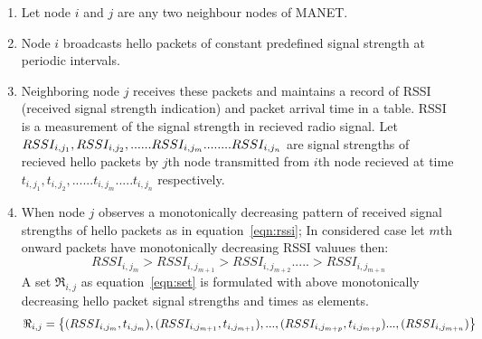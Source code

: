\documentclass[runningheads]{llncs}
\begin{document}
	\begin{enumerate}
		\item Let node $i$ and $j$ are any two neighbour nodes of MANET.
		\item Node $i$  broadcasts hello packets of constant predefined signal strength at periodic intervals.
		\item Neighboring node $j$ receives these packets and  maintains a record of RSSI (received signal strength indication) and packet arrival time in a table. RSSI is a measurement of the signal strength in recieved radio signal. Let $RSSI_{i,j_{1}},RSSI_{i,j_{2}},......RSSI_{i,j_{m}}...\\
		.....RSSI_{i,j_{n}}$ are signal strengths of recieved hello packets by  $j$th node transmitted from  $i$th node recieved at time  $t_{i,j_{1}},t_{i,j_{2}},......t_{i,j_{m}}.....t_{i,j_{n}}$ respectively.
		\item When node $j$ observes a monotonically decreasing pattern of received signal strengths of hello packets as in equation~\ref{eqn:rssi}; In considered case let $m$th onward packets have monotonically  decreasing RSSI valuues then:
		\begin{equation}
		\label{eqn:rssi}
		RSSI_{i,j_{m}}>RSSI_{i,j_{m+1}}>RSSI_{i,j_{m+2}}.....>RSSI_{i,j_{m+n}}
		\end{equation}
		A set ${\Re}_{i,j}$ as equation~\ref{eqn:set} is formulated with above monotonically decreasing hello packet signal strengths and times as elements.
		\begin{equation}
		\label{eqn:set}
		{\Re}_{i,j}= \left\lbrace (RSSI_{i,j_{m}},t_{i,j_{m}}),(RSSI_{i,j_{m+1}},t_{i,j_{m+1}}), \\
		...,(RSSI_{i,j_{m+p}},t_{i,j_{m+p}})...\\
		,(RSSI_{i,j_{m+n}})\right\rbrace 
		\end{equation}
		

\end{enumerate}
\end{document}
